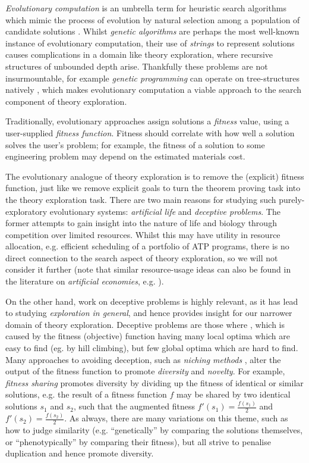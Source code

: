 \documentclass[]{article}
\begin{document}
\emph{Evolutionary computation} is an umbrella term for heuristic search algorithms which mimic the process of evolution by natural selection among a population of candidate solutions \cite{back1997evolutionary}. Whilst \emph{genetic algorithms} are perhaps the most well-known instance of evolutionary computation, their use of \emph{strings} to represent solutions causes complications in a domain like theory exploration, where recursive structures of unbounded depth arise. Thankfully these problems are not insurmountable, for example \emph{genetic programming} can operate on tree-structures natively \cite{banzhaf1998genetic}, which makes evolutionary computation a viable approach to the search component of theory exploration.

Traditionally, evolutionary approaches assign solutions a \emph{fitness} value, using a user-supplied \emph{fitness function}. Fitness should correlate with how well a solution solves the user's problem; for example, the fitness of a solution to some engineering problem may depend on the estimated materials cost.

The evolutionary analogue of theory exploration is to remove the (explicit) fitness function, just like we remove explicit goals to turn the theorem proving task into the theory exploration task. There are two main reasons for studying such purely-exploratory evolutionary systems: \emph{artificial life} and \emph{deceptive problems}. The former attempts to gain insight into the nature of life and biology through competition over limited resources. Whilst this may have utility in resource allocation, e.g. efficient scheduling of a portfolio of ATP programs, there is no direct connection to the search aspect of theory exploration, so we will not consider it further (note that similar resource-usage ideas can also be found in the literature on \emph{artificial economies}, e.g. \cite{baum2000evolution}).

On the other hand, work on deceptive problems is highly relevant, as it has lead to studying \emph{exploration in general}, and hence provides insight for our narrower domain of theory exploration. Deceptive problems are those where  \cite{lehman2011abandoning}, which is caused by the fitness (objective) function having many local optima which are easy to find (eg. by hill climbing), but few global optima which are hard to find. Many approaches to avoiding deception, such as \emph{niching methods} \cite{sareni1998fitness}, alter the output of the fitness function to promote \emph{diversity} and \emph{novelty}. For example, \emph{fitness sharing} promotes diversity by dividing up the fitness of identical or similar solutions, e.g. the result of a fitness function $f$ may be shared by two identical solutions $s_1$ and $s_2$, such that the augmented fitness $f'(s_1) = \frac{f(s_1)}{2}$ and $f'(s_2) = \frac{f(s_2)}{2}$. As always, there are many variations on this theme, such as how to judge similarity (e.g. ``genetically'' by comparing the solutions themselves, or ``phenotypically'' by comparing their fitness), but all strive to penalise duplication and hence promote diversity.
\end{document}
